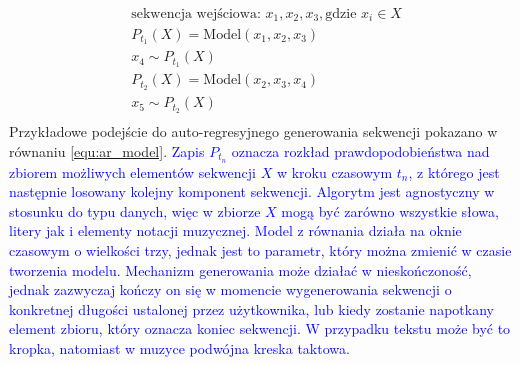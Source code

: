 \documentclass[data-science]{agh-wi} %
\begin{document}
\begin{equation}
    \begin{aligned}
         & \text{sekwencja wejściowa: } x_1, x_2, x_3, \text{gdzie } x_i \in X \\
         & P_{t_1}(X) = \text{Model}(x_1, x_2, x_3)                            \\
         & x_4 \sim P_{t_1}(X)                                                 \\
         & P_{t_2}(X) = \text{Model}(x_2, x_3, x_4)                            \\
         & x_5 \sim P_{t_2}(X)                                                 \\
    \end{aligned}
    \label{equ:ar_model}
\end{equation}
Przykładowe podejście do auto-regresyjnego generowania sekwencji pokazano w równaniu \ref*{equ:ar_model}. \textcolor{blue}{Zapis $P_{t_n}$ oznacza rozkład prawdopodobieństwa nad zbiorem możliwych elementów sekwencji $X$ w kroku czasowym $t_n$, z którego jest następnie losowany kolejny komponent sekwencji. Algorytm jest agnostyczny w stosunku do typu danych, więc w zbiorze $X$ mogą być zarówno wszystkie słowa, litery jak i elementy notacji muzycznej. Model z równania działa na oknie czasowym o wielkości trzy, jednak jest to parametr, który można zmienić w czasie tworzenia modelu. Mechanizm generowania może działać w nieskończoność, jednak zazwyczaj kończy on się w momencie wygenerowania sekwencji o konkretnej długości ustalonej przez użytkownika, lub kiedy zostanie napotkany element zbioru, który oznacza koniec sekwencji. W przypadku tekstu może być to kropka, natomiast w muzyce podwójna kreska taktowa.}
\end{document}
